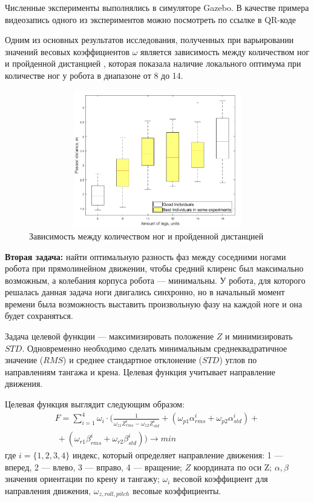 Численные эксперименты выполнялись в симуляторе Gazebo. В качестве примера видеозапись одного из экспериментов можно посмотреть по ссылке в QR-коде \quad {}

Одним из основных результатов исследования, полученных при варьировании значений весовых коэффициентов $\omega$ является зависимость между количеством ног и пройденной дистанцией , которая показала наличие локального оптимума при количестве ног у робота в диапазоне от 8 до 14. 

\begin{figure}[H]
    \centering\includegraphics[height=6cm,width=1\textwidth,keepaspectratio]{images/box_plot_structural_synthesis.png}
    \caption{Зависимость между количеством ног и пройденной дистанцией}
    \label{fig:box_plot_structural_synthesis.png}
\end{figure}

\textbf{Вторая задача:} найти оптимальную разность фаз между соседними ногами робота при прямолинейном движении, чтобы средний клиренс был максимально возможным, а колебания корпуса робота --- минимальны. У робота, для которого решалась данная задача ноги двигались синхронно, но в начальный момент времени была возможность выставить произвольную фазу на каждой ноге и она будет сохраняться.

Задача целевой функции --- максимизировать положение $Z$ и минимизировать $STD$. Одновременно необходимо сделать минимальным среднеквадратичное значение ($RMS$) и среднее стандартное отклонение ($STD$) углов по направлениям тангажа и крена. Целевая функция учитывает направление движения.

Целевая функция выглядит следующим образом:
\begin{align}
    \label{eq:objective}
    F = \sum\limits_{i=1}^4 \omega_{i} \cdot (\frac{1}{\omega_{z1}Z_{rms}^i - \omega_{z2}Z_{std}^i}  + ( \omega_{p1}\alpha_{rms}^i + \omega_{p2}\alpha_{std}^i) + \nonumber \\\ + (\omega_{r1}\beta_{rms}^i + \omega_{r2}\beta_{std}^i)) \rightarrow min
\end{align}
где $i =\{1,2,3,4\}$ индекс, который определяет направление движения: 1 --- вперед, 2 --- влево, 3 --- вправо, 4 --- вращение; $Z$ координата по оси Z; $\alpha, \beta$ значения ориентации по крену и тангажу; $\omega_{i}$ весовой коэффициент для направления движения, ${\omega}_{z,roll,pitch}$ весовые коэффициенты.

